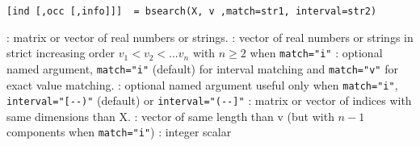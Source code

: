 
\begin{mandesc}
\end{mandesc}

\begin{calling_sequence}
\begin{verbatim}
[ind [,occ [,info]]]  = bsearch(X, v ,match=str1, interval=str2)
\end{verbatim}
\end{calling_sequence}
\begin{parameters}
  \begin{varlist}
     :  matrix or vector of real numbers or strings.
     : vector of real numbers or strings in strict
    increasing order  $v_1 <  v_2 < ... v_n$ with $n \ge 2$ 
    when  \verb+match="i"+
     : optional named argument, \verb+match="i"+
                         (default) for interval matching and
                         \verb+match="v"+ for exact value matching.
     : optional named argument useful only
                           when  \verb+match="i"+, \verb+interval="[--)"+
                         (default) or  \verb+interval="(--]"+
     : matrix or vector of indices with same dimensions than X.
     : vector of same length than v (but with $n-1$ components 
                  when  \verb+match="i"+)
     : integer scalar
  \end{varlist}
\end{parameters}

